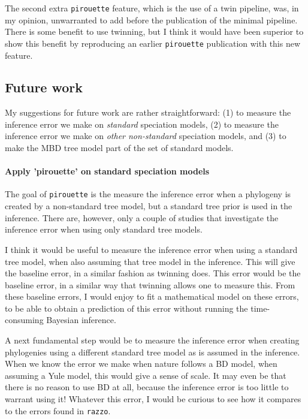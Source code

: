 The second extra \verb;pirouette; feature, which is the use of a twin pipeline,
was, in my opinion, unwarranted to add before the publication of the minimal
pipeline. There is some benefit to use twinning, but I think 
it would have been superior to show this benefit by reproducing an earlier
\verb;pirouette; publication with this new feature.

\subsection{Future work}

My suggestions for future work are rather straightforward:
(1) to measure the inference error we make on \emph{standard}
speciation models, (2) to measure the inference error we make 
on \emph{other non-standard} speciation models, and (3) to
make the MBD tree model part of the set of standard models.

\paragraph{Apply 'pirouette' on standard speciation models} 

The goal of \verb;pirouette; is the measure the inference error
when a phylogeny is created by a non-standard tree model,
but a standard tree prior is used in the inference. There are,
however, only a couple of studies that investigate the
inference error when using only standard tree models.

I think it would be useful to measure the inference
error when using a standard tree model, when also
assuming that tree model in the inference. This will give the
baseline error, in a similar fashion as twinning does.
This error would be the baseline error, in a similar way that
twinning allows one to measure this. From these baseline errors,
I would enjoy to fit a mathematical model on these errors,
to be able to obtain a prediction of this error without running
the time-consuming Bayesian inference.

A next fundamental step would be to measure the inference
error when creating phylogenies using a different standard tree model
as is assumed in the inference. 
When we know the error we make when nature follows a BD model,
when assuming a Yule model, this would give a sense of scale.
It may even be that there is no reason to use BD at all,
because the inference error is too little to warrant using it!
Whatever this error, I would be curious to see how it compares
to the errors found in \verb;razzo;. 

